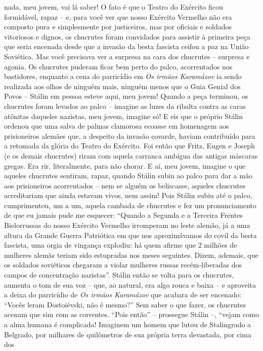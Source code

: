 nada, meu jovem, vai lá saber! O fato é que o Teatro do Exército ficou
formidável, rapaz -- e, para você ver que nosso Exército Vermelho não
era composto pura e simplesmente por justiceiros, mas por oficiais e
soldados vitoriosos e dignos, os chucrutes foram convidados para
assistir à primeira peça que seria encenada desde que a invasão da besta
fascista ceifou a paz na União Soviética. Mas você precisava ver a
surpresa na cara dos chucrutes -- surpresa e agonia. Os chucrutes
puderam ficar bem perto do palco, acorrentados nos bastidores, enquanto
a cena do parricídio em \emph{Os irmãos Karamázov} ia sendo realizada
aos olhos de ninguém mais, ninguém menos que o Guia Genial dos Povos --
Stálin em pessoa esteve aqui, meu jovem! Quando a peça terminou, os
chucrutes foram levados ao palco -- imagine as luzes da ribalta contra
as caras atônitas daqueles nazistas, meu jovem, imagine só! E eis que o
próprio Stálin ordenou que uma salva de palmas clamorosa ecoasse em
homenagem aos prisioneiros alemães que, a despeito da invasão covarde,
haviam contribuído para a retomada da glória do Teatro do Exército. Foi
então que Fritz, Eugen e Joseph (e os demais chucrutes) riram com aquela
carranca ambígua das antigas máscaras gregas. Era rir, literalmente,
para não chorar. E aí, meu jovem, imagine o que aqueles chucrutes
sentiram, rapaz, quando Stálin subiu ao palco para dar a mão aos
prisioneiros acorrentados -- nem se alguém os beliscasse, aqueles
chucrutes acreditariam que ainda estavam vivos, nem assim! Pois Stálin
subiu até o palco, cumprimentou, um a um, aquela cambada de chucrutes e
fez um pronunciamento de que eu jamais pude me esquecer: ``Quando a
Segunda e a Terceira Frentes Bielorrussas do nosso Exército Vermelho
irromperam no leste alemão, já a uma altura da Grande Guerra Patriótica
em que nos aproximávamos do covil da besta fascista, uma orgia de
vingança explodiu: há quem afirme que 2 milhões de mulheres alemãs
teriam sido estupradas nos meses seguintes. Dizem, ademais, que os
soldados soviéticos chegaram a violar mulheres russas recém-liberadas
dos campos de concentração nazistas''. Stálin então se volta para os
chucrutes, aumenta o tom de sua voz -- que, ao natural, era algo rouca e
baixa -- e aproveita a deixa do parricídio de \emph{Os irmãos Karamázov}
que acabara de ser encenado: ``Vocês leram Dostoiévski, não é mesmo?''
Sem saber o que fazer, os chucrutes acenam que sim com as correntes.
``Pois então'' -- prossegue Stálin --, ``vejam como a alma humana é
complicada! Imaginem um homem que lutou de Stalingrado a Belgrado, por
milhares de quilômetros de sua própria terra devastada, por cima dos
